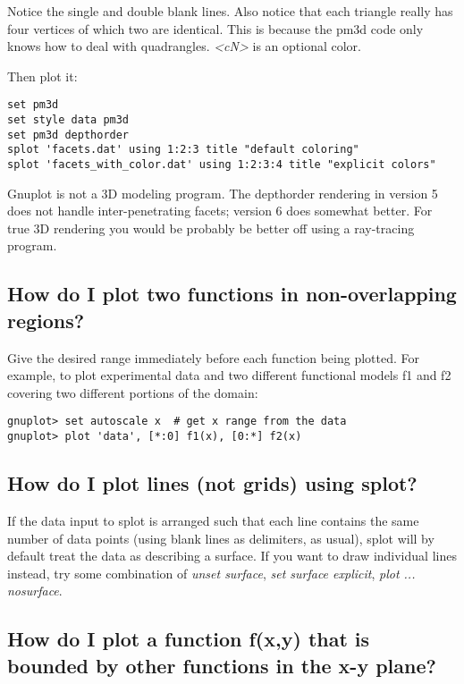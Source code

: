 \documentclass[letter,11pt]{article}
\begin{document}
{Notice the single and double blank lines. Also notice that each triangle
really has four vertices of which two are identical.  This is because the
pm3d code only knows how to deal with quadrangles.
\textit{<cN>} is an optional color.

Then plot it:
\small
\begin{verbatim}
set pm3d
set style data pm3d
set pm3d depthorder
splot 'facets.dat' using 1:2:3 title "default coloring"
splot 'facets_with_color.dat' using 1:2:3:4 title "explicit colors"
\end{verbatim}
\normalsize

Gnuplot is not a 3D modeling program.
The depthorder rendering in version 5 does not handle inter-penetrating facets;
version 6 does somewhat better.
For true 3D rendering you would be probably be better off using a ray-tracing program.

\subsection{How do I plot two functions in non-overlapping regions?}

Give the desired range immediately before each function being plotted.
For example, to plot experimental data and two different functional
models f1 and f2 covering two different portions of the domain:
\small
\begin{verbatim}
gnuplot> set autoscale x  # get x range from the data
gnuplot> plot 'data', [*:0] f1(x), [0:*] f2(x)
\end{verbatim}
\normalsize


\subsection{How do I plot lines (not grids) using splot?}

If the data input to splot is arranged such that each line contains
the same number of data points (using blank lines as delimiters, as usual),
splot will by default treat the data as describing a surface.
If you want to draw individual lines instead, try some combination of
\textit{unset surface}, \textit{set surface explicit}, \textit{plot ... nosurface}.


\subsection{How do I plot a function f(x,y) that is bounded by other
          functions in the x-y plane?}

}
\end{document}
